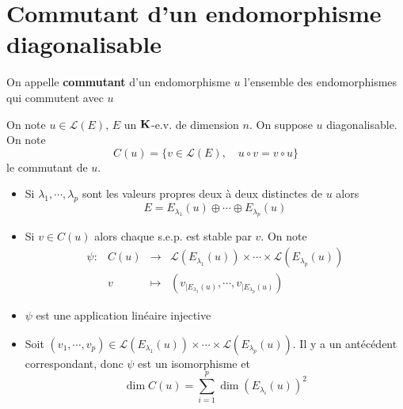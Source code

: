 \section{Commutant d'un endomorphisme diagonalisable}

\begin{dfn}
    On appelle \textbf{commutant} d'un endomorphisme $u$ l'ensemble des endomorphismes qui commutent avec $u$
\end{dfn}

On note $u\in\mathcal L(E)$, $E$ un $\mathbf K$-e.v. de dimension $n$. On suppose $u$ diagonalisable. On note \[
    C(u)=\{v\in\mathcal L(E), \quad u\circ v=v\circ u\}
\]
le commutant de $u$.

\begin{itemize}
    \item Si $\lambda_1, \cdots, \lambda_p$ sont les valeurs propres deux à deux distinctes de $u$ alors \[
            E=E_{\lambda_1}(u)\oplus \cdots \oplus E_{\lambda_p}(u)
        \]
    \item Si $v\in C(u)$ alors chaque s.e.p. est stable par $v$. On note \[
            \begin{matrix}
                \psi: & C(u) & \longrightarrow & \mathcal L(E_{\lambda_1}(u))\times \cdots \times \mathcal L(E_{\lambda_p}(u))\\
                      &v &\longmapsto & \left( v_{|E_{\lambda_1}(u)}, \cdots, v_{|E_{\lambda_p}(u)} \right)
            \end{matrix}
        \]
    \item $\psi$ est une application linéaire injective
    \item Soit $(v_1, \cdots, v_p)\in \mathcal L(E_{\lambda_1}(u))\times \cdots \times \mathcal L(E_{\lambda_p}(u))$. Il y a un antécédent correspondant, donc $\psi$ est un isomorphisme et \[
            \dim C(u)=\sum_{i=1}^p\dim(E_{\lambda_i}(u))^2
        \]
\end{itemize}
\endchapter
